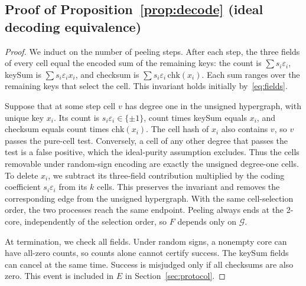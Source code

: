 \subsection{\texorpdfstring{Proof of Proposition~\ref{prop:decode} (ideal decoding equivalence)}{Proof of ideal decoding equivalence}}\label{app:proof-decode}
\begin{proof}
We induct on the number of peeling steps. After each step, the three fields of every cell equal the encoded sum of the remaining keys: the count is $\sum s_i\varepsilon_i$, keySum is $\sum s_i\varepsilon_i x_i$, and checksum is $\sum s_i\varepsilon_i\,\mathrm{chk}(x_i)$. Each sum ranges over the remaining keys that select the cell. This invariant holds initially by~\eqref{eq:fields}.

Suppose that at some step cell $v$ has degree one in the unsigned hypergraph, with unique key $x_i$. Its count is $s_i\varepsilon_i\in\{\pm1\}$, count times keySum equals $x_i$, and checksum equals count times $\mathrm{chk}(x_i)$. The cell hash of $x_i$ also contains $v$, so $v$ passes the pure-cell test. Conversely, a cell of any other degree that passes the test is a false positive, which the ideal-purity assumption excludes. Thus the cells removable under random-sign encoding are exactly the unsigned degree-one cells. To delete $x_i$, we subtract its three-field contribution multiplied by the coding coefficient $s_i\varepsilon_i$ from its $k$ cells. This preserves the invariant and removes the corresponding edge from the unsigned hypergraph. With the same cell-selection order, the two processes reach the same endpoint. Peeling always ends at the 2-core, independently of the selection order, so $F$ depends only on $\mathcal G$.

At termination, we check all fields. Under random signs, a nonempty core can have all-zero counts, so counts alone cannot certify success. The keySum fields can cancel at the same time. Success is misjudged only if all checksums are also zero. This event is included in $E$ in Section~\ref{sec:protocol}.
\end{proof}

